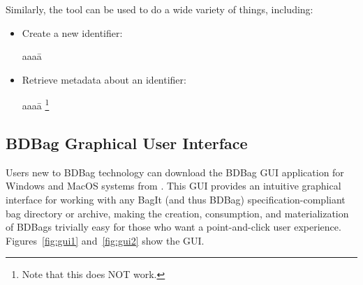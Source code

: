 \documentclass[11pt]{article}
\begin{document}
\noindent
Similarly, the  tool can be used to do a wide variety of things, including:

\begin{itemize}
\item
Create a new identifier:
\vspace{-2ex}
\begin{tabbing}
aaaa\=\kill
\>
\end{tabbing}

\item
Retrieve metadata about an identifier:
\vspace{-2ex}
\begin{tabbing}
aaaa\=\kill
\>\footnote{Note that this does NOT work.}
\end{tabbing}
\end{itemize}

\subsection{BDBag Graphical User Interface}

Users new to BDBag technology can download the BDBag GUI application for Windows and MacOS systems from
.  This GUI provides an intuitive graphical interface for
working with any BagIt (and thus BDBag) specification-compliant bag directory or archive, making the creation, consumption, and
materialization of BDBags trivially easy for those who want a point-and-click user experience.
Figures~\ref{fig:gui1} and~\ref{fig:gui2} show the GUI.
\end{document}
